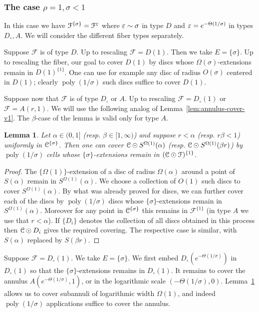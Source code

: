 \documentclass[reqno]{amsart}
\newtheorem{Lem}[Cor]{Lemma}{\bfseries}{\itshape}
\renewcommand\~[1]{\widetilde{#1}}
\def\poly{\operatorname{poly}} \def\J{\operatorname{J}}
\def\cF{{\mathcal F}} \def\cL{{\mathcal L}} \def\cR{{\mathcal R}}
\def\he#1{{\{#1\}}}
\def\hsigma{{\he\sigma}}
\begin{document}
\subsubsection{The case $\rho=1,\sigma<1$}
In this case we have $\cF^\hsigma=\cF^\e$ where
$\varepsilon\sim\sigma$ in type $D$ and $\varepsilon= e^{-\Theta(1/\sigma)}$ in types
$D_\circ,A$. We will consider the different fiber types separately.

Suppose $\cF$ is of type $D$. Up to rescaling $\cF=D(1)$. Then we take
$E=\hsigma$. Up to rescaling the fiber, our goal to cover $D(1)$ by
discs whose $\Omega(\sigma)$-extensions remain in $D(1)^{\he1}$. One
can use for example any disc of radius $O(\sigma)$ centered in $D(1)$;
clearly $\poly(1/\sigma)$ such discs suffice to cover $D(1)$.

Suppose now that $\cF$ is of type $D_\circ$ or $A$. Up to rescaling
$\cF=D_\circ(1)$ or $\cF=A(r,1)$. We will use the following analog of
Lemma~\ref{lem:annulus-cover-v1}. The $\beta$-case of the lemma is
valid only for type $A$.
\begin{Lem}\label{lem:annulus-cover-v2}
  Let $\alpha\in(0,1]$ (resp. $\beta\in[1,\infty)$) and suppose
  $r<\alpha$ (resp. $r\beta<1$) uniformly in $\cC^\hsigma$. Then one
  can cover ${\mathcal C}\odot S^{\Omega(1)}(\alpha)$
  (resp. ${\mathcal C}\odot S^{\Omega(1)}(\beta r)$) by $\poly(1/\sigma)$
  cells whose $\hsigma$-extensions remain in $(\cC\odot\cF)^{\he1}$.
\end{Lem}
\begin{proof}
  The $\he{\Omega(1)}$-extension of a disc of radius $\Omega(\alpha)$
  around a point of $S(\alpha)$ remain in $S^{\Omega(1)}(\alpha)$. We
  choose a collection of $O(1)$ such discs to cover
  $S^{\Omega(1)}(\alpha)$. By what was already proved for discs, we
  can further cover each of the discs by $\poly(1/\sigma)$ discs whose
  $\hsigma$-extensions remain in $S^{\Omega(1)}(\alpha)$. Moreover for
  any point in $\cC^\hsigma$ this remains in $\cF^{\he1}$ (in type $A$
  we use that $r<\alpha$). If $\{D_i\}$ denotes the collection of all
  discs obtained in this process then ${\mathcal C}\odot D_i$ gives the
  required covering. The respective case is similar, with $S(\alpha)$
  replaced by $S(\beta r)$.
\end{proof}

Suppose $\cF=D_\circ(1)$. We take $E=\hsigma$. We first embed
$D_\circ(e^{-\Theta(1/\sigma)})$ in $D_\circ(1)$ so that the
$\hsigma$-extensions remains in $D_\circ(1)$. It remains to cover the
annulus $A(e^{-\Theta(1/\sigma)},1)$, or in the logarithmic scale
$(-\Theta(1/\sigma),0)$. Lemma~\ref{lem:annulus-cover-v2} allows us to
cover subannuli of logarithmic width $\Omega(1)$, and indeed
$\poly(1/\sigma)$ applications suffice to cover the annulus.
\end{document}

